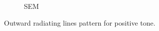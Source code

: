 \begin{figure}[!t]
\begin{subfigure}[t]{0.24\linewidth}
  	\centering
  	\caption{SEM}
  	\label{fig:b2d3_q3}
  \end{subfigure}
\caption{Outward radiating lines pattern for positive tone.}
 \end{figure}

